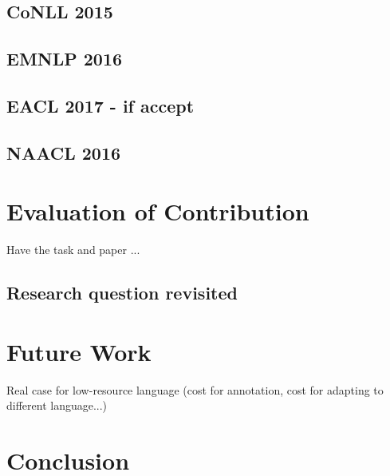 \documentclass[12pt,twoside,final,hidelinks]{ltthesis}
\theoremstyle{definition}
\begin{document}
\subsection{CoNLL 2015}
\label{sec:conll15}

\subsection{EMNLP 2016}
\label{sec:emnlp16}
%

\subsection{EACL 2017 - if accept}
\label{sec:eacl17}
%
\subsection{NAACL 2016}
\label{sec:naacl16}

\section{Evaluation of Contribution}
\label{sec:evaluation_contribution}
Have the task and paper ...
\subsection{Research question revisited}
\section{Future Work}
\label{sec:futurework}
Real case for low-resource language (cost for annotation, cost for adapting to different language...)
\section{Conclusion}
\label{sec:conclusion}

%


%


%



%
\end{document}
